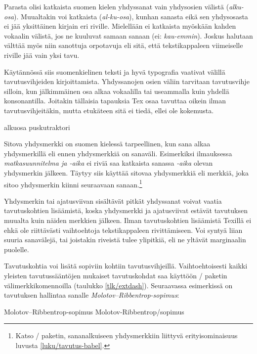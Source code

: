 Parasta olisi katkaista suomen kielen yhdyssanat vain yhdysosien välistä
(\emph{alku-osa}). Muualtakin voi katkaista (\emph{al-ku-osa}), kunhan
sanasta eikä sen yhdysosasta ei jää yksittäinen kirjain eri riville.
Mielellään ei katkaista myöskään kahden vokaalin välistä, jos ne
kuuluvat samaan sanaan (ei: \emph{kau-emmin}). Joskus halutaan välttää
myös niin sanottuja orpotavuja eli sitä, että tekstikappaleen
viimeiselle riville jää vain yksi tavu.

Käytännössä siis suomenkielinen teksti ja hyvä typografia vaativat
välillä tavutusvihjeiden kirjoittamista. Yhdyssanojen osien väliin
tarvitaan tavutusvihje silloin, kun jälkimmäinen osa alkaa vokaalilla
tai useammalla kuin yhdellä konsonantilla. Joitakin tällaisia tapauksia
Tex osaa tavuttaa oikein ilman tavutusvihjeitäkin, mutta etukäteen sitä
ei tiedä, ellei ole kokemusta.

\komentoi{-}
\begin{koodilohkosis}
alku\-osa pusku\-traktori
\end{koodilohkosis}

\noindent
Sitova yhdysmerkki on suomen kielessä tarpeellinen, kun sana alkaa
yhdysmerkillä eli ennen yhdysmerkkiä on sanaväli. Esimerkiksi
ilmauksessa \emph{matkasuunnitelma ja \mbox{-aika}} ei riviä saa
katkaista sanassa \emph{\mbox{-aika}} olevan yhdysmerkin jälkeen. Täytyy
siis käyttää sitovaa yhdysmerkkiä eli merkkiä, joka sitoo yhdysmerkin
kiinni seuraavaan sanaan.\footnote{Katso \-/ paketin,
  sanan\-alkuiseen yhdysmerkkiin liittyvä erityisominaisuus luvusta
  \ref{luku/tavutus-babel}.}

Yhdysmerkin tai ajatusviivan sisältävät pitkät yhdyssanat voivat vaatia
tavutuskohtien lisäämistä, koska yhdysmerkki ja ajatusviivat estävät
tavutuksen muualta kuin näiden merkkien jälkeen. Ilman tavutuskohtien
lisäämistä Texillä ei ehkä ole riittävästi vaihtoehtoja tekstikappaleen
rivittämiseen. Voi syntyä liian suuria sanavälejä, tai joistakin
riveistä tulee ylipitkiä, eli ne yltävät marginaalin puolelle.

Tavutuskohtia voi lisätä sopiviin kohtiin tavutusvihjeillä.
Vaihtoehtoisesti kaikki yleisten tavutussääntöjen mukaiset tavutuskohdat
saa käyttöön \-/ paketin välimerkkikomennoilla
(taulukko \ref{tlk/extdash}). Seuraavassa esimerkissä on tavutuksen
hallintaa sanalle \emph{Molo\-tov--Ribben\-trop-sopi\-mus}:

\komentoi{-}
\komentoi{--}
\komentoi{-/}
\begin{koodilohkosis}
Molo\-tov--Ribben\-trop-sopi\-mus %
Molotov\--Ribben\-trop\-/sopimus  %
\end{koodilohkosis}

